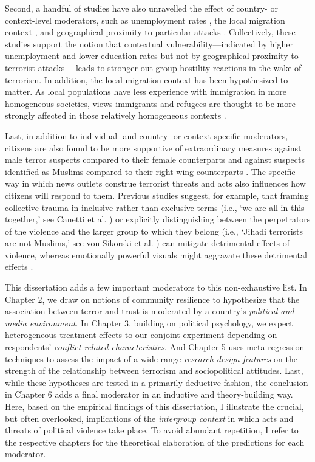 Second, a handful of studies have also unravelled the effect of country- or context-level moderators, such as unemployment rates \citep{Legewie2013, Castanhosilva2018}, the local migration context \citep{Nussio2019, Legewie2013}, and geographical proximity to particular attacks \citep{Nussio2019}. Collectively, these studies support the notion that contextual vulnerability---indicated by higher unemployment and lower education rates \citep{Legewie2013, Castanhosilva2018} but not by geographical proximity to terrorist attacks \citep{Nussio2019}---leads to stronger out-group hostility reactions in the wake of terrorism. In addition, the local migration context has been hypothesized to matter. As local populations have less experience with immigration in more homogeneous societies, views immigrants and refugees are thought to be more strongly affected in those relatively homogeneous contexts \citep{Nussio2019}. 


Last, in addition to individual- and country- or context-specific moderators, citizens are also found to be more supportive of extraordinary measures against male terror suspects compared to their female counterparts \citep{Lindner2018a} and against suspects identified as Muslims compared to their right-wing counterparts \citep{Piazza2015}. The specific way in which news outlets construe terrorist threats and acts also influences how citizens will respond to them. Previous studies suggest, for example, that framing collective trauma in inclusive rather than exclusive terms (i.e., `we are all in this together,' see Canetti et al. \citeyear{Canetti2018a}) or explicitly distinguishing between the perpetrators of the violence and the larger group to which they belong (i.e., `Jihadi terrorists are not Muslims,' see von Sikorski et al. \citeyear{VonSikorski2017}) can mitigate detrimental effects of violence, whereas emotionally powerful visuals might aggravate these detrimental effects \citep{Gadarian2010c}. 



This dissertation adds a few important moderators to this non-exhaustive list. In Chapter 2, we draw on notions of community resilience to hypothesize that the association between terror and trust is moderated by a country's \textit{political and media environment}. In Chapter 3, building on political psychology, we expect heterogeneous treatment effects to our conjoint experiment depending on respondents' \textit{conflict-related characteristics}. And Chapter 5 uses meta-regression techniques to assess the impact of a wide range \textit{research design features} on the strength of the relationship between terrorism and sociopolitical attitudes. Last, while these hypotheses are tested in a primarily deductive fashion, the conclusion in Chapter 6 adds a final moderator in an inductive and theory-building way. Here, based on the empirical findings of this dissertation, I illustrate the crucial, but often overlooked, implications of the \textit{intergroup context} in which acts and threats of political violence take place. To avoid abundant repetition, I refer to the respective chapters for the theoretical elaboration of the predictions for each moderator.



